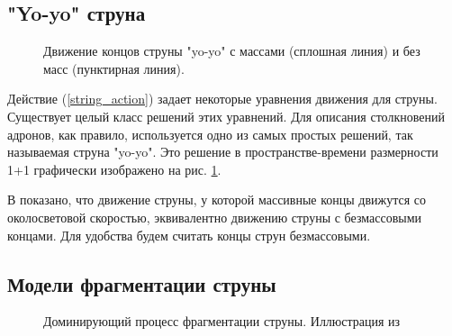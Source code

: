 \documentclass[12pt]{article}
\begin{document}
\subsection{"Yo-yo" струна}
\begin{figure}[h!]
\caption{Движение концов струны "yo-yo" с массами (сплошная линия) и без масс (пунктирная линия).}
\label{yoyo}
\end{figure}
Действие (\ref{string_action}) задает некоторые уравнения движения для струны. Существует целый класс решений этих уравнений. Для описания столкновений адронов, как правило, используется одно из самых простых решений, так называемая струна "yo-yo". Это решение в пространстве-времени размерности 1+1 графически изображено на рис. \ref{yoyo}.

В \cite{nesterenko} показано, что движение струны, у которой массивные концы движутся со околосветовой скоростью, эквивалентно движению струны с безмассовыми концами. Для удобства будем считать концы струн безмассовыми.

\subsection{Модели фрагментации струны}
\label{fragmentation_subsection}
\begin{figure}
\caption{Доминирующий процесс фрагментации струны. Иллюстрация из \cite{fragmentation_lit}}
\label{fragmentation}
\end{figure}
\end{document}

